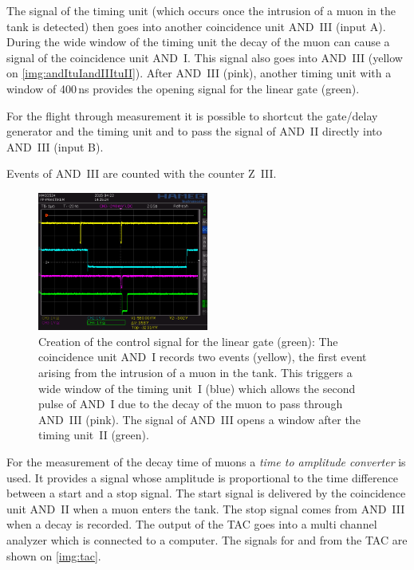 The signal of the timing unit (which occurs once the intrusion of a muon in the tank is detected)
then goes into another coincidence unit AND~III (input A).
During the wide window of the timing unit the decay of the muon can cause a signal
of the coincidence unit AND~I. This signal also goes into AND~III
(yellow on \autoref{img:andItuIandIIItuII}).
After AND~III (pink),
another timing unit with a window of 400\,ns provides the opening signal for the linear gate (green).

For the flight through measurement it is possible to shortcut the gate/delay generator and the timing unit
and to pass the signal of AND~II directly into AND~III (input B).

Events of AND~III are counted with the counter Z~III.

\begin{figure}[H]
\begin{center}
  \includegraphics[width=0.5\textwidth]{../img/S0010.PNG}
  \caption{Creation of the control signal for the linear gate (green):
  The coincidence unit AND~I records two events (yellow), the first event arising from the intrusion
  of a muon in the tank. This triggers a wide window of the timing unit~I (blue) which
  allows the second pulse of AND~I due to the decay of the muon to pass through AND~III (pink).
  The signal of AND~III opens a window after the timing unit~II (green).}
  \label{img:andItuIandIIItuII}
\end{center}
\end{figure}

For the measurement of the decay time of muons a \emph{time to amplitude converter} is used.
It provides a signal whose amplitude is proportional to the time difference between a start and a stop signal.
The start signal is delivered by the coincidence unit AND~II when a muon enters the tank.
The stop signal comes from AND~III when a decay is recorded.
The output of the TAC goes into a multi channel analyzer which is connected to a computer.
The signals for and from the TAC are shown on \autoref{img:tac}.\\

